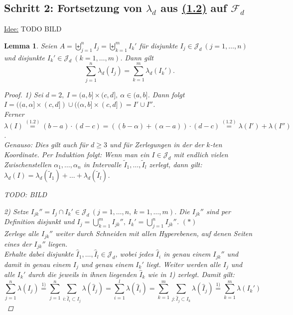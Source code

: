\documentclass[a4paper]{report}
\newcommand{\Fd}{\mathcal{F}_d}
\newcommand{\Jd}{\mathcal{J}_d}
\newcommand{\bigdcup}{\biguplus}
\newcommand{\jlabel}[1]{\label{j_#1}}
\newcommand{\jhyperref}[2]{\hyperref[j_#1]{#2}}
\newcommand{\jlink}[1]{\jhyperref{#1}{#1}}
\newcommand{\jspace}{\vspace{8pt}}
\theoremstyle{plain}
\newtheorem{lem}[thm]{Lemma}
\theoremstyle{definition}
\begin{document}
{{{\subsection*{Schritt 2: Fortsetzung von $\lambda_d$ aus \jlink{(1.2)} auf $\Fd$}

\uline{Idee:} TODO BILD

\begin{lem}
\jlabel{Lem 1.16}
    Seien $A = \bigdcup_{j=1}^n I_j = \bigdcup_{k=1}^m I_k'$ für disjunkte $I_j \in \Jd \ (j=1, \dots, n)$ und disjunkte $I_k' \in \Jd \ (k=1,\dots,m)$. Dann gilt
    \begin{displaymath}
        \sum_{j=1}^n \lambda_d(I_j) = \sum_{k=1}^m \lambda_d(I_k').
    \end{displaymath}
    \begin{proof}
        1) Sei $d=2, \ I = (a,b] \times (c,d], \ \alpha \in (a,b]$. Dann folgt $I=((a,\alpha] \times (c,d])\cup ((\alpha,b] \times (c,d]) = I' \cup I''$.\\
        Ferner $\lambda(I) \overset{\jlink{(1.2)}}{=} (b-a)\cdot (d-c) = ((b-\alpha) + (\alpha - a))\cdot (d-c) \overset{\jlink{(1.2)}}{=} \lambda(I') + \lambda(I'')$.\\
        Genauso: Dies gilt auch für $d \ge 3$ und für Zerlegungen in der der $k$-ten Koordinate. Per Induktion folgt: Wenn man ein $I \in \Jd$ mit endlich vielen Zwischenstellen $\alpha_1,\dots,\alpha_n$ in Intervalle $\tilde{I}_1,\dots, \tilde{I}_l$ zerlegt, dann gilt: $\lambda_d(I) = \lambda_d(\tilde{I}_1) + \dots + \lambda_d(\tilde{I}_l) $.
        
        \jspace
        
        TODO: BILD
        
        \jspace
        
        2) Setze $I_{jk}'' = I_j \cap I_k' \in \Jd \ (j=1,\dots,n, \ k=1,\dots,m)$. Die $I_{jk}''$ sind per Definition disjunkt und $I_j = \bigcup_{k=1}^m I_{jk}'',\ I_k' = \bigcup_{j=1}^n I_{jk}''$. $(*)$\\
        Zerlege alle $I_{jk}''$ weiter durch Schneiden mit allen Hyperebenen, auf denen Seiten eines der $I_{jk}''$ liegen.\\
        Erhalte dabei disjunkte $\hat{I}_1, \dots, \hat{I}_l \in \Jd$, wobei jedes $\hat{I}_i$ in genau einem $I_{jk}''$ und damit in genau einem $I_j$ und genau einem $I_k'$ liegt. Weiter werden alle $I_j$ und alle $I_k'$ durch die jeweils in ihnen liegenden $\hat{I}_k$ wie in 1) zerlegt. Damit gilt:
        \begin{displaymath}
            \sum_{j=1}^n \lambda(I_j) \overset{\text{1)}}{=} \sum_{j=1}^n \sum_{i: \hat{I}_i \subset I_j} \lambda(\hat{I}_j) = \sum_{i=1}^l \lambda(\hat{I}_i) = \sum_{k=1}^m \sum_{j: \hat{I}_j \subset I_k} \lambda(\hat{I}_j) \overset{1)}{=} \sum_{k=1}^m \lambda(I_k')
        \end{displaymath}
    \end{proof}
\end{lem}

}}}
\end{document}
